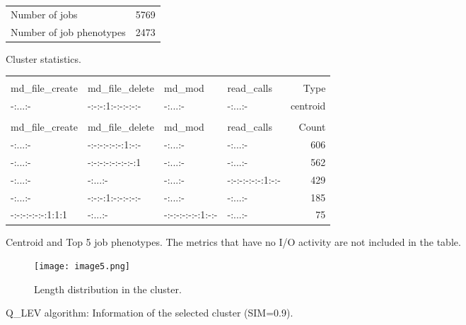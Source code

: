 \documentclass{jhps}
\begin{document}
\begin{figure}
	\begin{subtable}{\textwidth}
		\centering
		\begin{tabular}{ll}
			\centering
			Number of jobs & 5769 \\
			Number of job phenotypes & 2473 \\
		\end{tabular}
		\caption{Cluster statistics.}
		\label{cluster:hex_lev:stats}
	\end{subtable}
	\medskip
	\begin{subtable}{\textwidth}
		\centering
		\begin{tiny}
			\begin{tabular}{llll|r}
				\rowcolor{tblhead}
				\multicolumn{4}{l|}{Q-coding} & \\
				\rowcolor{tblhead}
				md\_file\_create  & md\_file\_delete  & md\_mod           & read\_calls       & Type     \\
				\hline
				-:...:-           & -:-:-:1:-:-:-:-:- & -:...:-           & -:...:-           & centroid \\
				\multicolumn{5}{l}{}\\
				\rowcolor{tblhead}
				md\_file\_create  & md\_file\_delete  & md\_mod           & read\_calls       & Count    \\
				\hline
				-:...:-           & -:-:-:-:-:-:1:-:- & -:...:-           & -:...:-           & 606      \\
				-:...:-           & -:-:-:-:-:-:-:-:1 & -:...:-           & -:...:-           & 562      \\
				-:...:-           & -:...:-           & -:...:-           & -:-:-:-:-:-:1:-:- & 429      \\
				-:...:-           & -:-:-:1:-:-:-:-:- & -:...:-           & -:...:-           & 185      \\
				-:-:-:-:-:-:1:1:1 & -:...:-           & -:-:-:-:-:-:1:-:- & -:...:-           & 75       \\
			\end{tabular}
		\end{tiny}
		\caption{Centroid and Top 5 job phenotypes. The metrics that have no I/O activity are not included in the table.}
		\label{cluster:hex_lev:top_jobs}
	\end{subtable}
	\medskip
	\begin{subfigure}{\textwidth}
		\centering
		\texttt{[image: image5.png]}
		\caption{Length distribution in the cluster.}
		\label{cluster:hex_lev:length}
	\end{subfigure}
	\caption{Q\_LEV algorithm: Information of the selected cluster (SIM=0.9).}
	\label{cluster:hex_lev}
\end{figure}
\end{document}
